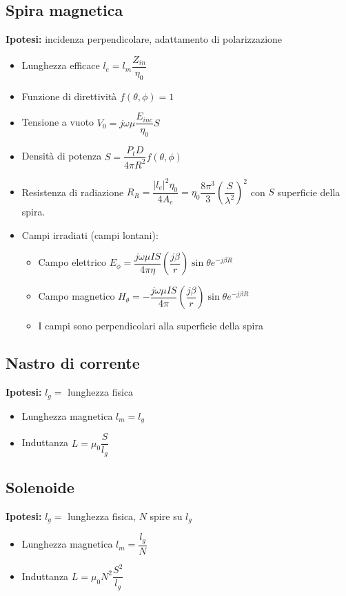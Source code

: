 \documentclass{article}
\begin{document}
\subsection{Spira magnetica}
\textbf{Ipotesi:} incidenza perpendicolare, adattamento di polarizzazione
\begin{itemize}
	\item Lunghezza efficace \(l_e = l_m \dfrac{Z_{in}}{\eta_0}\)
	\item Funzione di direttività \(f(\theta, \phi) = 1 \)
	\item Tensione a vuoto \( V_0 = j \omega \mu \dfrac{E_{inc}}{\eta_0} S \)
	\item Densità di potenza \( S = \dfrac{P_t D}{4 \pi R^2} f(\theta, \phi) \)
	\item Resistenza di radiazione \( R_R = \dfrac{|l_e|^2 \eta_0}{4 A_e} = \eta_0 \dfrac{8 \pi^3}{3}\left( \dfrac{S}{\lambda^2} \right) ^ 2 \) con \(S\) superficie della spira.
	\item Campi irradiati (campi lontani):
	      \begin{itemize}
		      \item Campo elettrico \(E_\phi = \dfrac{j \omega \mu I S}{4 \pi \eta} \left( \dfrac{j \beta}{r} \right) \sin\theta e^ {-j \beta R} \)
		      \item Campo magnetico \(H_\theta = - \dfrac{j \omega \mu I S}{4 \pi} \left( \dfrac{j \beta}{r} \right) \sin\theta e^ {-j \beta R} \)
		      \item I campi sono perpendicolari alla superficie della spira
	      \end{itemize}
\end{itemize}

\subsection{Nastro di corrente}
\textbf{Ipotesi:} \(l_g = \) lunghezza fisica
\begin{itemize}
	\item Lunghezza magnetica \( l_m = l_g \)
	\item Induttanza \( L = \mu_0 \dfrac{S}{l_g} \)
\end{itemize}

\subsection{Solenoide}
\textbf{Ipotesi:} \(l_g = \) lunghezza fisica, \(N\) spire su \(l_g\)
\begin{itemize}
	\item Lunghezza magnetica \(l_m = \dfrac{l_g}{N} \)
	\item Induttanza \( L = \mu_0 N^2 \dfrac{S^2}{l_g} \)
\end{itemize}
\end{document}
